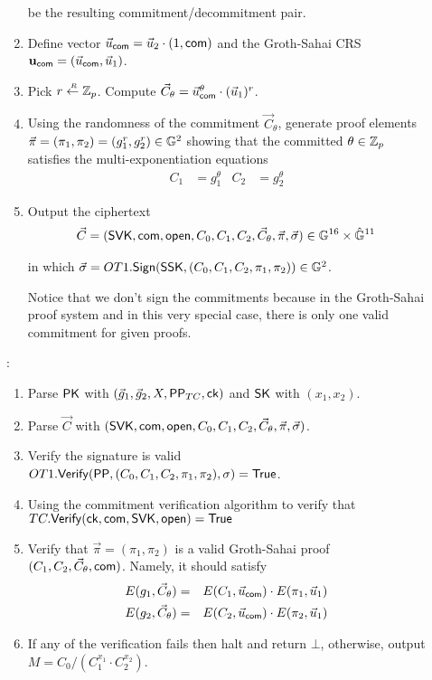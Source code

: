 \begin{description}
\begin{enumerate}
    be the resulting commitment/decommitment pair.
  \item Define vector $\vec{u}_{\mathsf{com}} = \vec{u}_2\cdot (1, \mathsf{com})$ and the Groth-Sahai CRS $\mathbf{u}_{\mathsf{com}}=(\vec{u}_{\mathsf{com}},\vec{u}_1)$. 
  \item Pick $r \stackrel{{\scriptscriptstyle \mkern4mu R}}{\gets} \mathbb{Z}_p$. Compute $\vec{C}_{\theta} = \vec{u}_{\mathsf{com}}^{\theta} \cdot (\vec{u}_1)^r$.
  \item Using the randomness of the commitment $\vec{C}_{\theta}$, generate  proof elements $\vec{\pi}=(\pi_1,\pi_2)=(g_1^r,g_2^r) \in \mathbb{G}^2$ showing that the committed $\theta \in \mathbb{Z}_p$ satisfies the multi-exponentiation equations
    \begin{align*}
      C_1 &= g_1^{\theta} & C_2 &= g_2^{\theta}
    \end{align*}
  \item Output the ciphertext
    \begin{align*}
      \vec{C} = (\mathsf{SVK}, \mathsf{com}, \mathsf{open}, C_0, C_1, C_2, \vec{C}_{\theta}, \vec{\pi}, \vec{\sigma}) \in \mathbb{G}^{16} \times \hat{\mathbb{G}}^{11}
    \end{align*}
    
    
    in which $\vec{\sigma} = OT1.{\mathsf{Sign}}(\mathsf{SSK}, (C_0, C_1, C_2, {\pi}_1,\pi_2)) \in \mathbb{G}^2$.

    Notice that we don't sign the commitments because in the Groth-Sahai proof system and in this very special case, there is only one valid commitment for given proofs.
    
  \end{enumerate}
  
\item[\boldmath{$SPCCA.\Dec(\PK, \vec{C}, \SK)$}]:
  \begin{enumerate}
  \item Parse $\mathsf{PK}$ with $(\vec{g}_1, \vec{g}_2, X, \mathsf{PP}_{TC}, \mathsf{ck})$ and $\mathsf{SK}$ with $(x_1, x_2)$.
  \item Parse $\vec{C}$ with $ (\mathsf{SVK}, \mathsf{com}, \mathsf{open}, C_0, C_1, C_2, \vec{C}_{\theta}, \vec{\pi}, \vec{\sigma})$.
  \item Verify the signature is valid $OT1.{\mathsf{Verify}}(\mathsf{PP},  (C_0, C_1, C_2, \pi_1,\pi_2), \sigma) = \mathsf{True}$.
  \item Using the commitment verification algorithm to verify that $TC.{\mathsf{Verify}}(\mathsf{ck}, \mathsf{com}, \mathsf{SVK}, \mathsf{open}) = \mathsf{True}$
  \item Verify that $\vec{\pi}=(\pi_1,\pi_2)$ is a valid Groth-Sahai proof \wrt  $(C_1, C_2, \vec{C}_{\theta}, \mathsf{com})$. Namely, 
    it should satisfy 
    \begin{eqnarray} \label{ver-eq} 
      E(g_1,\vec{C}_{\theta}) &=& E(C_1 , \vec{u}_{\mathsf{com}}) \cdot E(\pi_1,\vec{u}_1) \\ \nonumber
      E(g_2,\vec{C}_{\theta}) &=& E(C_2 , \vec{u}_{\mathsf{com}}) \cdot E(\pi_2,\vec{u}_1)
    \end{eqnarray}
  \item If any of the verification fails then halt and return $\bot$, otherwise, output $M=C_0/(C_1^{x_1}\cdot C_2^{x_2})$.
  \end{enumerate}
  
\end{description}


